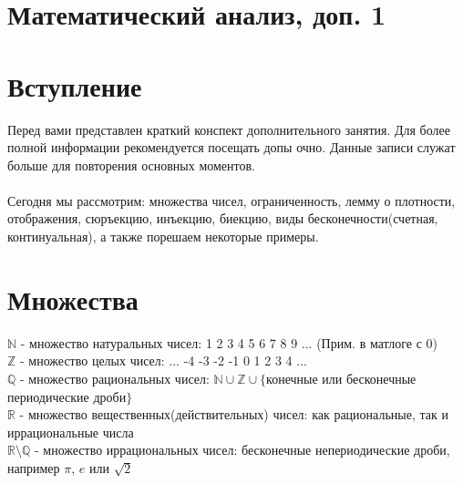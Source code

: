 \documentclass[a4paper]{article}
\begin{document}
 \centering\section*{Математический анализ, доп. 1}
 \raggedright
 \section{Вступление}
\justifying
 Перед вами представлен краткий конспект дополнительного занятия. Для более полной информации рекомендуется посещать допы очно. Данные записи служат больше для повторения основных моментов.
 \\\\
 Сегодня мы рассмотрим: множества чисел, ограниченность, лемму о плотности, отображения, сюръекцию, инъекцию, биекцию, виды бесконечности(счетная, континуальная), а также порешаем некоторые примеры. 
\section{Множества}
$\mathbb{N}$ - множество натуральных чисел: 1 2 3 4 5 6 7 8 9 ... (Прим. в матлоге с 0) \\
$\mathbb{Z}$ - множество целых чисел: ... -4 -3 -2 -1 0 1 2 3 4 ... \\
$\mathbb{Q}$ - множество рациональных чисел: $\mathbb{N \cup Z} \cup \{$конечные или бесконечные периодические дроби$\}$ \\
$\mathbb{R}$ - множество вещественных(действительных) чисел: как рациональные, так и иррациональные числа\\
$\mathbb{R \setminus Q}$ - множество иррациональных чисел: бесконечные непериодические дроби, например $\pi$, $e$ или $\sqrt{2}$\\
\end{document}
